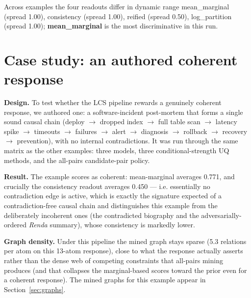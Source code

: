 \documentclass[11pt]{article}
\begin{document}
Across examples the four readouts differ in dynamic range mean\_marginal (spread 1.00), consistency (spread 1.00), reified (spread 0.50), log\_partition (spread 1.00); \textbf{mean\_marginal} is the most discriminative in this run.

\section{Case study: an authored coherent response}

\textbf{Design.} To test whether the LCS pipeline rewards a genuinely coherent response, we authored one: a software-incident post-mortem that forms a single sound causal chain (deploy $\to$ dropped index $\to$ full table scan $\to$ latency spike $\to$ timeouts $\to$ failures $\to$ alert $\to$ diagnosis $\to$ rollback $\to$ recovery $\to$ prevention), with no internal contradictions. It was run through the same matrix as the other examples: three models, three conditional-strength UQ methods, and the all-pairs candidate-pair policy.

\textbf{Result.} The example scores as coherent: mean-marginal averages 0.771, and crucially the consistency readout averages 0.450 --- i.e. essentially no contradiction edge is active, which is exactly the signature expected of a contradiction-free causal chain and distinguishes this example from the deliberately incoherent ones (the contradicted biography and the adversarially-ordered \emph{Renda} summary), whose consistency is markedly lower.

\textbf{Graph density.} Under this pipeline the mined graph stays sparse (5.3 relations per atom on this 13-atom response), close to what the response actually asserts rather than the dense web of competing constraints that all-pairs mining produces (and that collapses the marginal-based scores toward the prior even for a coherent response). The mined graphs for this example appear in Section~\ref{sec:graphs}.
\end{document}
